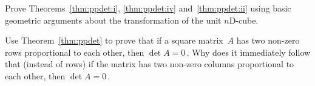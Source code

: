 \begin{exercise} \label{ex:} 
Prove Theorems~\ref{thm:ppdet:i}, \ref{thm:ppdet:iv} and~\ref{thm:ppdet:ii} using basic geometric arguments about the transformation of the unit \(n\)D-cube.
%
\end{exercise}




\begin{exercise} \label{ex:} 
Use Theorem~\ref{thm:ppdet} to prove that if a square matrix~\(A\) has two non-zero rows proportional to each other, then \(\det A=0\)\,.
Why does it immediately follow that (instead of rows) if the matrix has two non-zero columns proportional to each other, then \(\det A=0\)\,.
\end{exercise}




